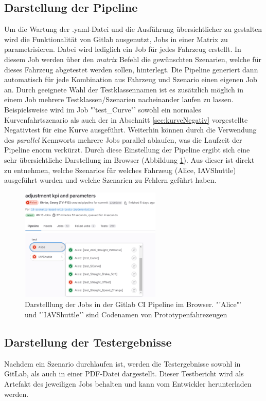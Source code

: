 \subsection{Darstellung der Pipeline}
Um die Wartung der .yaml-Datei und die Ausführung übersichtlicher zu gestalten wird die Funktionalität von Gitlab ausgenutzt, Jobs in einer Matrix zu parametrisieren. Dabei wird lediglich ein Job für jedes Fahrzeug erstellt. In diesem Job werden über den \textit{matrix} Befehl die gewünschten Szenarien, welche für dieses Fahrzeug abgetestet werden sollen, hinterlegt. Die Pipeline generiert dann automatisch für jede Kombination aus Fahrzeug und Szenario einen eigenen Job an. Durch geeignete Wahl der Testklassennamen ist es zusätzlich möglich in einem Job mehrere Testklassen/Szenarien nacheinander laufen zu lassen. Beispielsweise wird im Job "'test\_Curve"' sowohl ein normales Kurvenfahrtszenario als auch der in Abschnitt \ref{sec:kurveNegativ} vorgestellte Negativtest für eine Kurve ausgeführt. Weiterhin können durch die Verwendung des \textit{parallel} Kennworts mehrere Jobs parallel ablaufen, was die Laufzeit der Pipeline enorm verkürzt. Durch diese Einstellung der Pipeline ergibt sich eine sehr übersichtliche Darstellung im Browser (Abbildung \ref{fig:uebersicht_pipeline}). Aus dieser ist direkt zu entnehmen, welche Szenarios für welches Fahrzeug (Alice, IAVShuttle) ausgeführt wurden und welche Szenarien zu Fehlern geführt haben.
\begin{figure}[ht]
    \centering
    \includegraphics[width=0.6\textwidth]{figures/3_Implementierung/uebersicht_pipeline.png}
    \caption[Darstellung der Jobs in der GitLab CI Pipeline]{Darstelllung der Jobs in der Gitlab CI Pipeline im Browser. "'Alice"' und "'IAVShuttle"' sind Codenamen von Prototypenfahrezeugen}
    \label{fig:uebersicht_pipeline}
\end{figure}

\subsection{Darstellung der Testergebnisse}
Nachdem ein Szenario durchlaufen ist, werden die Testergebnisse sowohl in GitLab, als auch in einer PDF-Datei dargestellt. Dieser Testbericht wird als Artefakt des jeweiligen Jobs behalten und kann vom Entwickler herunterladen werden.

